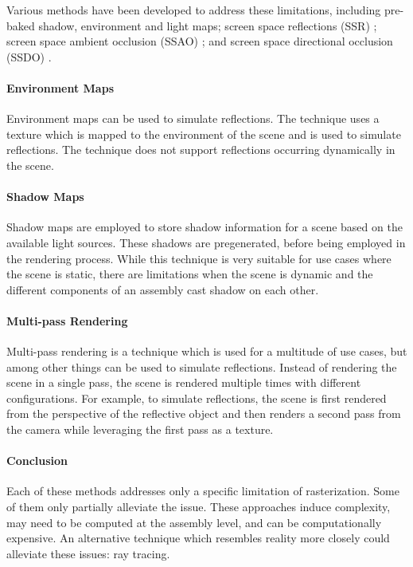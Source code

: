 Various methods have been developed to address these limitations, including pre-baked shadow, environment \cite{greene1986environment} and light maps; screen space reflections (SSR) \cite{screenSpaceReflectionsStackowiak}; screen space ambient occlusion (SSAO) \cite{bavoil2008ssao}; and screen space directional occlusion (SSDO) \cite{ritschel2009ssdo}.

\paragraph{Environment Maps}

Environment maps can be used to simulate reflections. The technique uses a texture which is mapped to the environment of the scene and is used to simulate reflections. The technique does not support reflections occurring dynamically in the scene.

\paragraph{Shadow Maps}

Shadow maps are employed to store shadow information for a scene based on the available light sources. These shadows are pregenerated, before being employed in the rendering process. While this technique is very suitable for use cases where the scene is static, there are limitations when the scene is dynamic and the different components of an assembly cast shadow on each other.

\paragraph{Multi-pass Rendering}

Multi-pass rendering is a technique which is used for a multitude of use cases, but among other things can be used to simulate reflections. Instead of rendering the scene in a single pass, the scene is rendered multiple times with different configurations. For example, to simulate reflections, the scene is first rendered from the perspective of the reflective object and then renders a second pass from the camera while leveraging the first pass as a texture.

\paragraph{Conclusion}

Each of these methods addresses only a specific limitation of rasterization. Some of them only partially alleviate the issue. These approaches induce complexity, may need to be computed at the assembly level, and can be computationally expensive. An alternative technique which resembles reality more closely could alleviate these issues: ray tracing.

